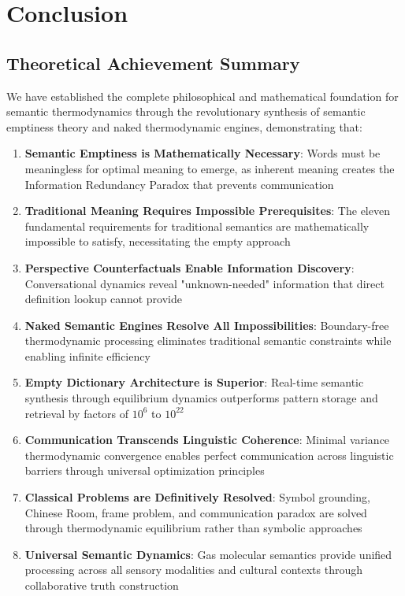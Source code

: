 \documentclass[11pt,a4paper]{article}
\begin{document}
\section{Conclusion}

\subsection{Theoretical Achievement Summary}

We have established the complete philosophical and mathematical foundation for semantic thermodynamics through the revolutionary synthesis of semantic emptiness theory and naked thermodynamic engines, demonstrating that:

\begin{enumerate}
\item \textbf{Semantic Emptiness is Mathematically Necessary}: Words must be meaningless for optimal meaning to emerge, as inherent meaning creates the Information Redundancy Paradox that prevents communication
\item \textbf{Traditional Meaning Requires Impossible Prerequisites}: The eleven fundamental requirements for traditional semantics are mathematically impossible to satisfy, necessitating the empty approach
\item \textbf{Perspective Counterfactuals Enable Information Discovery}: Conversational dynamics reveal "unknown-needed" information that direct definition lookup cannot provide
\item \textbf{Naked Semantic Engines Resolve All Impossibilities}: Boundary-free thermodynamic processing eliminates traditional semantic constraints while enabling infinite efficiency
\item \textbf{Empty Dictionary Architecture is Superior}: Real-time semantic synthesis through equilibrium dynamics outperforms pattern storage and retrieval by factors of $10^6$ to $10^{22}$
\item \textbf{Communication Transcends Linguistic Coherence}: Minimal variance thermodynamic convergence enables perfect communication across linguistic barriers through universal optimization principles
\item \textbf{Classical Problems are Definitively Resolved}: Symbol grounding, Chinese Room, frame problem, and communication paradox are solved through thermodynamic equilibrium rather than symbolic approaches
\item \textbf{Universal Semantic Dynamics}: Gas molecular semantics provide unified processing across all sensory modalities and cultural contexts through collaborative truth construction
\end{enumerate}
\end{document}
